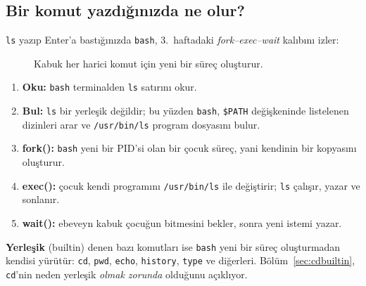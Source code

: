 \documentclass[11pt,a4paper]{article}
\newcommand{\term}[1]{\textbf{\color{mintdeep}#1}}
\newcommand{\cmd}[1]{\texttt{#1}}
\begin{document}
\subsection{Bir komut yazdığınızda ne olur?}
\label{sec:forkexec}

\cmd{ls} yazıp Enter'a bastığınızda \cmd{bash}, 3.\ haftadaki \emph{fork--exec--wait} kalıbını izler:

\begin{figure}[H]
\centering
{}
\caption{Kabuk her harici komut için yeni bir süreç oluşturur.}
\end{figure}

\begin{enumerate}[leftmargin=1.4em]
  \item \textbf{Oku:} \cmd{bash} terminalden \texttt{ls} satırını okur.
  \item \textbf{Bul:} \cmd{ls} bir yerleşik değildir; bu yüzden \cmd{bash}, \texttt{\$PATH} değişkeninde listelenen dizinleri arar ve \texttt{/usr/bin/ls} program dosyasını bulur.
  \item \textbf{fork():} \cmd{bash} yeni bir PID'si olan bir çocuk süreç, yani kendinin bir kopyasını oluşturur.
  \item \textbf{exec():} çocuk kendi programını \texttt{/usr/bin/ls} ile değiştirir; \cmd{ls} çalışır, yazar ve sonlanır.
  \item \textbf{wait():} ebeveyn kabuk çocuğun bitmesini bekler, sonra yeni istemi yazar.
\end{enumerate}

\term{Yerleşik} (builtin) denen bazı komutları ise \cmd{bash} yeni bir süreç oluşturmadan kendisi yürütür: \cmd{cd}, \cmd{pwd}, \cmd{echo}, \cmd{history}, \cmd{type} ve diğerleri. Bölüm~\ref{sec:cdbuiltin}, \cmd{cd}'nin neden yerleşik \emph{olmak zorunda} olduğunu açıklıyor.
\end{document}
